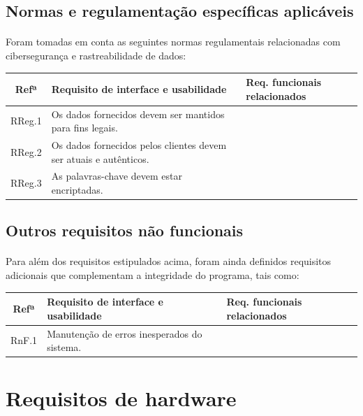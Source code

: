\documentclass[11pt,a4paper,twoside]{report}
\begin{document}
\subsection{Normas e regulamentação específicas aplicáveis}

\paragraph{}

Foram tomadas em conta as seguintes normas regulamentais relacionadas com cibersegurança e rastreabilidade de dados:

\begin{tabularx}{\textwidth}{|c|X|p{}|}
	\hline
	\textbf{Refª} 	& \textbf{Requisito de interface e usabilidade }  & \textbf{Req. funcionais relacionados}  \\
	\hline
	RReg.1    & Os dados fornecidos devem ser mantidos para fins legais.      &   \\
	\hline
	RReg.2 	  & Os dados fornecidos pelos clientes devem ser atuais e autênticos.    &    \\
	\hline
	RReg.3    & As palavras-chave devem estar encriptadas.       &  \\
	\hline
\end{tabularx}


\subsection{Outros requisitos não funcionais }

\paragraph{}

Para além dos requisitos estipulados acima, foram ainda definidos requisitos adicionais que complementam a integridade do programa, tais como:

\begin{tabularx}{\textwidth}{|c|X|p{}|}
	\hline
	\textbf{Refª} 	& \textbf{Requisito de interface e usabilidade  }  & \textbf{Req. funcionais relacionados}  \\
	\hline
	RnF.1     & Manutenção de erros inesperados do sistema.       &   \\
	\hline
\end{tabularx}


\section{Requisitos de hardware }
\end{document}

